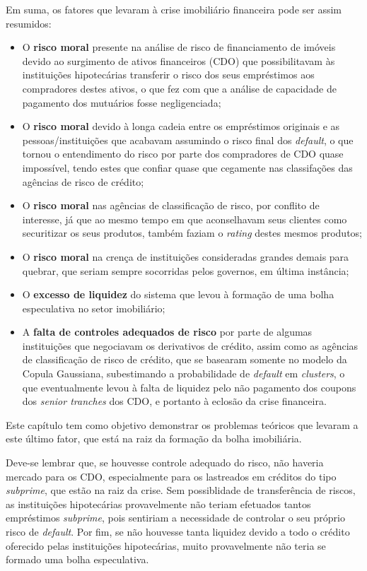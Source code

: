 \documentclass[
	12pt,				%
	oneside,			%
	a4paper,			%
	chapter=TITLE,		%
	section=TITLE,		%
	english,			%
	brazil				%
	]{abntex2}
\begin{document}
\begin{refsection}
Em suma, os fatores que levaram à crise imobiliário financeira pode ser assim
resumidos:
\begin{itemize}
\item
  O \textbf{risco moral} presente na análise de risco de financiamento de imóveis
  devido ao surgimento de ativos financeiros (\gls{CDO}) que possibilitavam às
  instituições hipotecárias transferir o risco dos seus empréstimos aos
  compradores destes ativos, o que fez com que a análise de capacidade de
  pagamento dos mutuários fosse negligenciada;
\item
  O \textbf{risco moral} devido à longa cadeia entre os empréstimos originais e as
  pessoas/instituições que acabavam assumindo o risco final dos \emph{default}, o que
  tornou o entendimento do risco por parte dos compradores de \gls{CDO} quase
  impossível, tendo estes que confiar quase que cegamente nas classifações das
  agências de risco de crédito;
\item
  O \textbf{risco moral} nas agências de classificação de risco, por conflito de
  interesse, já que ao mesmo tempo em que aconselhavam seus clientes como
  securitizar os seus produtos, também faziam o \emph{rating} destes mesmos produtos;
\item
  O \textbf{risco moral} na crença de instituições consideradas grandes demais para
  quebrar, que seriam sempre socorridas pelos governos, em última instância;
\item
  O \textbf{excesso de liquidez} do sistema que levou à formação de uma bolha
  especulativa no setor imobiliário;
\item
  A \textbf{falta de controles adequados de risco} por parte de algumas instituições
  que negociavam os derivativos de crédito, assim como as agências de
  classificação de risco de crédito, que se basearam somente no modelo da Copula
  Gaussiana, subestimando a probabilidade de \emph{default} em \emph{clusters}, o que
  eventualmente levou à falta de liquidez pelo não pagamento dos coupons dos
  \emph{senior tranches} dos \gls{CDO}, e portanto à eclosão da crise financeira.
\end{itemize}
Este capítulo tem como objetivo demonstrar os problemas teóricos que levaram
a este último fator, que está na raiz da formação da bolha imobiliária.

Deve-se lembrar que, se houvesse controle adequado do risco, não haveria mercado
para os \gls{CDO}, especialmente para os lastreados em créditos do tipo
\emph{subprime}, que estão na raiz da crise. Sem possiblidade de transferência de
riscos, as instituições hipotecárias provavelmente não teriam efetuados tantos
empréstimos \emph{subprime}, pois sentiriam a necessidade de controlar o seu próprio
risco de \emph{default}. Por fim, se não houvesse tanta liquidez devido a todo o
crédito oferecido pelas instituições hipotecárias, muito provavelmente não teria
se formado uma bolha especulativa.


\end{refsection}
\end{document}
